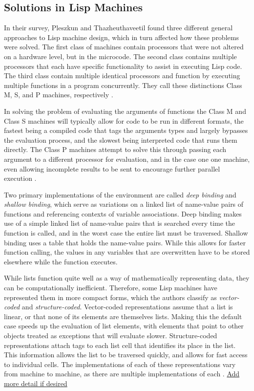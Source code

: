 \documentclass[journal]{IEEEtran}
\begin{document}
\subsection{Solutions in Lisp Machines}
In their survey, Pleszkun and Thazheuthaveetil found three different general approaches to Lisp machine design, which in turn affected how these problems were solved. The first class of machines contain processors that were not altered on a hardware level, but in the microcode. The second class contains multiple processors that each have specific functionality to assist in executing Lisp code. The third class contain multiple identical processors and function by executing multiple functions in a program concurrently. They call these distinctions Class M, S, and P machines, respectively \cite{pt}.

In solving the problem of evaluating the arguments of functions the Class M and Class S machines will typically allow for code to be run in different formats, the fastest being a compiled code that tags the arguments types and largely bypasses the evaluation process, and the slowest being interpreted code that runs them directly. The Class P machines attempt to solve this through passing each argument to a different processor for evaluation, and in the case one one machine, even allowing incomplete results to be sent to encourage further parallel execution \cite{pt}.

Two primary implementations of the environment are called \textit{deep binding} and \textit{shallow binding}, which serve as variations on a linked list of name-value pairs of functions and referencing contexts of variable associations. Deep binding makes use of a simple linked list of name-value pairs that is searched every time the function is called, and in the worst case the entire list must be traversed. Shallow binding uses a table that holds the name-value pairs. While this allows for faster function calling, the values in any variables that are overwritten have to be stored elsewhere while the function executes.

While lists function quite well as a way of mathematically representing data, they can be computationally inefficient. Therefore, some Lisp machines have represented them in more compact forms, which the authors classify as \textit{vector-coded} and \textit{structure-coded}. Vector-coded representations assume that a list is linear, or that none of its elements are themselves lists. Making this the default case speeds up the evaluation of list elements, with elements that point to other objects treated as exceptions that will evaluate slower. Structure-coded representations attach tags to each list cell that identifies its place in the list. This information allows the list to be traversed quickly, and allows for fast access to individual cells. The implementations of each of these representations vary from machine to machine, as there are multiple implementations of each \cite{pt}. \underline{Add more detail if desired}
\end{document}
